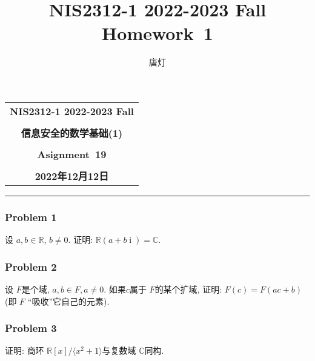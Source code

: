 \documentclass[a4paper,12pt]{ctexart}
\title{NIS2312-1 2022-2023 Fall Homework~1}
\author{唐灯}
\newcommand{\Com}{\mathbb{C}}
\newcommand{\R}{\mathbb{R}}
\begin{document}
  \begin{center}

  \vspace{-0.3in}
  \begin{tabular}{c}
    \textbf{\Large NIS2312-1 2022-2023 Fall} \\
    \textbf{\Large  } \\
    \textbf{\Large  信息安全的数学基础(1)} \\
    \textbf{\Large  } \\
    \textbf{\Large  Asignment~19} \\
    \textbf{\Large  } \\
    \textbf{\Large 2022年12月12日} \\
  \end{tabular}
  \end{center}
  \noindent
  \rule{\linewidth}{0.4pt}
  

\subsubsection*{Problem 1}
    设 $ a,b\in\R $, $ b\ne 0 $. 证明: $ \R(a+b\operatorname{i})=\Com $.

\subsubsection*{Problem 2}
    设 $ F $是个域, $ a,b\in F,a\ne 0 $. 如果$ c $属于 $ F $的某个扩域, 证明: $ F(c)=F(ac+b) $(即 $ F $ ``吸收''它自己的元素).
    
\subsubsection*{Problem 3}
    证明: 商环 $ \R[x]/\langle x^2+1\rangle $与复数域 $ \Com $同构. 
\end{document}
